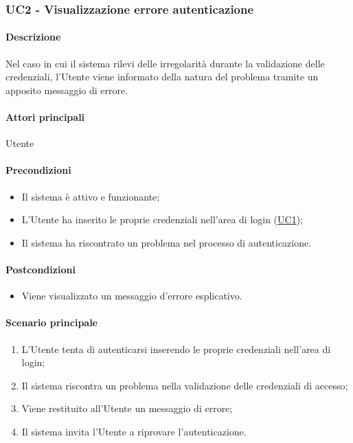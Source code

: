 \subsubsection{UC2 - Visualizzazione errore autenticazione}\label{UC2}


\paragraph*{Descrizione}
Nel caso in cui il sistema rilevi delle irregolarità durante la validazione delle credenziali, l'Utente viene informato della natura del problema tramite un apposito messaggio di errore.

\paragraph*{Attori principali}
Utente

\paragraph*{Precondizioni}
\begin{itemize}
  \item Il sistema è attivo e funzionante;
  \item L'Utente ha inserito le proprie credenziali nell'area di login (\hyperref[UC1]{UC1});
  \item Il sistema ha riscontrato un problema nel processo di autenticazione.  
\end{itemize}

\paragraph*{Postcondizioni}
\begin{itemize}
  \item Viene visualizzato un messaggio d'errore esplicativo.
\end{itemize}

\paragraph*{Scenario principale}
\begin{enumerate}
  \item L'Utente tenta di autenticarsi inserendo le proprie credenziali nell'area di login;
  \item Il sistema riscontra un problema nella validazione delle credenziali di accesso;
  \item Viene restituito all'Utente un messaggio di errore;
  \item Il sistema invita l'Utente a riprovare l'autenticazione.
\end{enumerate}

